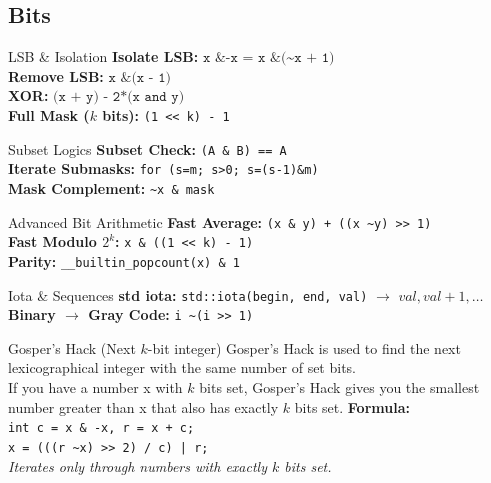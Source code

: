 \documentclass[10pt,a4paper,twocolumn]{article}
\begin{document}
	\subsection{Bits}
	\begin{bitbox}{LSB \& Isolation}
        \textbf{Isolate LSB:} $\texttt{x \& -x}$ = $\texttt{x \& (\textasciitilde x + 1)}$ \\
        \textbf{Remove LSB:} $\texttt{x \& (x - 1)}$ \\
        \textbf{XOR: } $\texttt{(x + y) - 2*(x and y)}$ \\
        \textbf{Full Mask ($k$ bits):} \texttt{(1 << k) - 1}
    \end{bitbox}
    \begin{bitbox}{Subset Logics}
        \textbf{Subset Check:} \texttt{(A \& B) == A} \\
        \textbf{Iterate Submasks:} \texttt{for (s=m; s>0; s=(s-1)\&m)} \\
        \textbf{Mask Complement:} \texttt{\textasciitilde x \& mask}
\end{bitbox}
    \begin{bitbox}{Advanced Bit Arithmetic}
        \textbf{Fast Average:} \texttt{(x \& y) + ((x \textasciitilde y) >> 1)} \\
        \textbf{Fast Modulo $2^k$:} \texttt{x \& ((1 << k) - 1)} \\
        \textbf{Parity:} \texttt{\_\_builtin\_popcount(x) \& 1}
    \end{bitbox}
    \begin{bitbox}{Iota \& Sequences}
        \textbf{std iota:} \texttt{std::iota(begin, end, val)} $\rightarrow$ $val, val+1, \dots$ \\
        \textbf{Binary $\rightarrow$ Gray Code:} \texttt{i \textasciitilde (i >> 1)} \\
    \end{bitbox}
    \begin{bitbox}{Gosper's Hack (Next $k$-bit integer)}
        Gosper's Hack is used to find the next lexicographical integer with the same number of set bits. \\

        If you have a number x with $k$ bits set, Gosper's Hack gives you the smallest number greater than x that also has exactly $k$ bits set.
        \textbf{Formula:} \\
        \texttt{int c = x \& -x, r = x + c;} \\
        \texttt{x = (((r \textasciitilde x) >> 2) / c) | r;} \\
        \textit{Iterates only through numbers with exactly $k$ bits set.}
    \end{bitbox}
\end{document}
